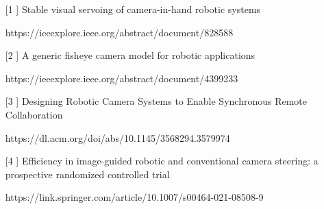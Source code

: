 \documentclass[a4paper,11pt]{report}
\begin{document}
\begin{itemize}
\item[[1]] Stable visual servoing of camera-in-hand robotic systems

https://ieeexplore.ieee.org/abstract/document/828588

\item[[2]] A generic fisheye camera model for robotic applications

https://ieeexplore.ieee.org/abstract/document/4399233

\item[[3]] Designing Robotic Camera Systems to Enable Synchronous Remote Collaboration

https://dl.acm.org/doi/abs/10.1145/3568294.3579974

\item[[4]] Efficiency in image-guided robotic and conventional camera steering: a prospective randomized controlled trial

https://link.springer.com/article/10.1007/s00464-021-08508-9

\vspace{12pt}
\end{itemize}
\end{document}
